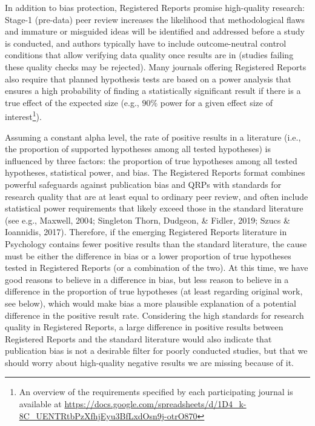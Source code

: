 \documentclass[british,,jou,floatsintext]{apa6}
\begin{document}
In addition to bias protection, Registered Reports promise high-quality research: Stage-1 (pre-data) peer review increases the likelihood that methodological flaws and immature or misguided ideas will be identified and addressed before a study is conducted, and authors typically have to include outcome-neutral control conditions that allow verifying data quality once results are in (studies failing these quality checks may be rejected).
Many journals offering Registered Reports also require that planned hypothesis tests are based on a power analysis that ensures a high probability of finding a statistically significant result if there is a true effect of the expected size (e.g., \(90\%\) power for a given effect size of interest\footnote{An overview of the requirements specified by each participating journal is available at \url{https://docs.google.com/spreadsheets/d/1D4_k-8C_UENTRtbPzXfhjEyu3BfLxdOsn9j-otrO870}}).

Assuming a constant alpha level, the rate of positive results in a literature (i.e., the proportion of supported hypotheses among all tested hypotheses) is influenced by three factors: the proportion of true hypotheses among all tested hypotheses, statistical power, and bias.
The Registered Reports format combines powerful safeguards against publication bias and QRPs with standards for research quality that are at least equal to ordinary peer review, and often include statistical power requirements that likely exceed those in the standard literature (see e.g., Maxwell, 2004; Singleton Thorn, Dudgeon, \& Fidler, 2019; Szucs \& Ioannidis, 2017).
Therefore, if the emerging Registered Reports literature in Psychology contains fewer positive results than the standard literature, the cause must be either the difference in bias or a lower proportion of true hypotheses tested in Registered Reports (or a combination of the two).
At this time, we have good reasons to believe in a difference in bias, but less reason to believe in a difference in the proportion of true hypotheses (at least regarding original work, see below), which would make bias a more plausible explanation of a potential difference in the positive result rate.
Considering the high standards for research quality in Registered Reports, a large difference in positive results between Registered Reports and the standard literature would also indicate that publication bias is not a desirable filter for poorly conducted studies, but that we should worry about high-quality negative results we are missing because of it.
\end{document}
